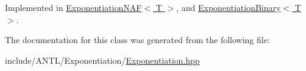 Implemented in \hyperlink{classExponentiationNAF_a1d880c4c55d754fcf5e225c36e980c03}{Exponentiation\-N\-A\-F$<$ T $>$}, and \hyperlink{classExponentiationBinary_ab2743c957571da9b56a8369b1d00a176}{Exponentiation\-Binary$<$ T $>$}.



The documentation for this class was generated from the following file\-:\begin{DoxyCompactItemize}
\item 
include/\-A\-N\-T\-L/\-Exponentiation/\hyperlink{Exponentiation_8hpp}{Exponentiation.\-hpp}\end{DoxyCompactItemize}
